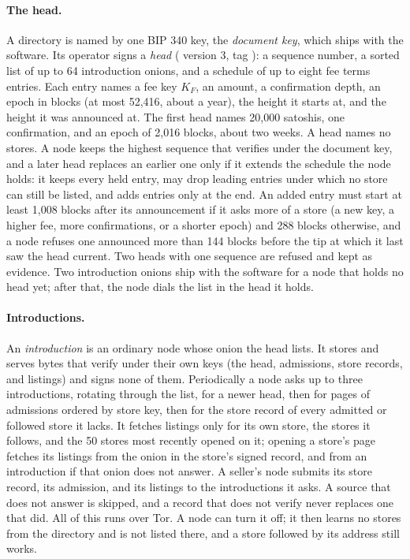 \paragraph{The head.} A directory is named by one BIP 340 key, the \emph{document key}, which ships with the software. Its operator signs a \emph{head} ( version 3, tag ): a sequence number, a sorted list of up to 64 introduction onions, and a schedule of up to eight fee terms entries. Each entry names a fee key $K_F$, an amount, a confirmation depth, an epoch in blocks (at most 52{,}416, about a year), the height it starts at, and the height it was announced at. The first head names 20{,}000 satoshis, one confirmation, and an epoch of 2{,}016 blocks, about two weeks. A head names no stores. A node keeps the highest sequence that verifies under the document key, and a later head replaces an earlier one only if it extends the schedule the node holds: it keeps every held entry, may drop leading entries under which no store can still be listed, and adds entries only at the end. An added entry must start at least 1{,}008 blocks after its announcement if it asks more of a store (a new key, a higher fee, more confirmations, or a shorter epoch) and 288 blocks otherwise, and a node refuses one announced more than 144 blocks before the tip at which it last saw the head current. Two heads with one sequence are refused and kept as evidence. Two introduction onions ship with the software for a node that holds no head yet; after that, the node dials the list in the head it holds.

\paragraph{Introductions.} An \emph{introduction} is an ordinary node whose onion the head lists. It stores and serves bytes that verify under their own keys (the head, admissions, store records, and listings) and signs none of them. Periodically a node asks up to three introductions, rotating through the list, for a newer head, then for pages of admissions ordered by store key, then for the store record of every admitted or followed store it lacks. It fetches listings only for its own store, the stores it follows, and the 50 stores most recently opened on it; opening a store's page fetches its listings from the onion in the store's signed record, and from an introduction if that onion does not answer. A seller's node submits its store record, its admission, and its listings to the introductions it asks. A source that does not answer is skipped, and a record that does not verify never replaces one that did. All of this runs over Tor. A node can turn it off; it then learns no stores from the directory and is not listed there, and a store followed by its address still works.

